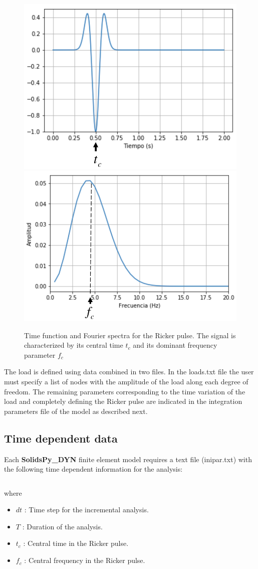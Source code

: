 \documentclass[11pt,letterpaper]{article}
\begin{document}
 
 \begin{figure}[H]
  \centering
  \includegraphics[width=6 cm]{img/pulse.pdf}
  \includegraphics[width=6 cm]{img/fourier.pdf}
    \caption{Time function and Fourier spectra for the Ricker pulse. The signal is characterized by its central time $t_c$ and its dominant frequency parameter $f_c$}
  \label{fig:mesh}
\end{figure}

The load is defined using data combined in two files. In the loads.txt file the user must specify a list of nodes with the amplitude of the load along each degree of freedom. The remaining parameters corresponding to the time variation of the load and completely defining the Ricker pulse are indicated in the integration parameters file of the model as described next.


\subsection{Time dependent data}
Each {\bf SolidsPy\_DYN} finite element model requires a text file (inipar.txt) with the following time dependent information for the analysis:

\inputminted[mathescape,
               numbersep=5pt,
               gobble=0,
               frame=lines,
               framesep=2mm]{c}{iniparT.txt}
               
where

\begin{itemize}
\item {\bf $dt$}   : Time step for the incremental analysis.
\item {\bf $T$}    : Duration of the analysis.
\item {\bf $t_c$} : Central time in the Ricker pulse.
\item {\bf $f_c$} : Central frequency in the Ricker pulse.
\end{itemize}
\end{document}
